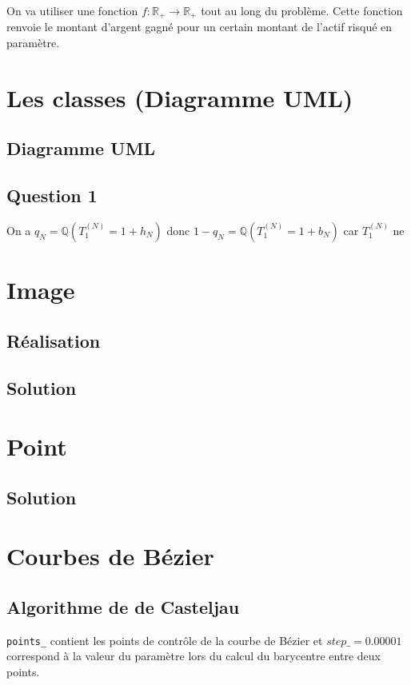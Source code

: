 \documentclass[a4paper, 12pt]{article}
\begin{document}
	On va utiliser une fonction $f:  \mathbb{R}_+ \rightarrow \mathbb{R}_+$ tout au long du problème. Cette fonction renvoie le montant d'argent gagné pour un certain montant de l'actif risqué en paramètre.\\
		
	\newpage

\section{Les classes (Diagramme UML)}			
\subsection{Diagramme UML}
\subsection{Question 1}
On a $q_N=\mathbb{Q}(T_1^{(N)}=1+h_N)$ donc $1-q_N=\mathbb{Q}(T_1^{(N)}=1+b_N)$ car $T_1^{(N)}$ ne 

\section{Image}	
\subsection{Réalisation}
\subsection{Solution}

\section{Point}	
\subsection{Solution}

\newpage
\section{Courbes de Bézier}	
\subsection{Algorithme de de Casteljau}

\texttt{points\_} contient les points de contrôle de la courbe de Bézier et $step\_ = 0.00001$ correspond à la valeur du paramètre lors du calcul du barycentre entre deux points.
\end{document}
